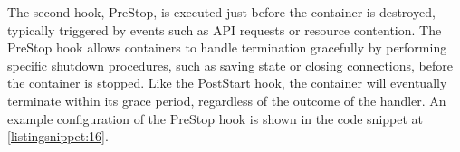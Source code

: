 
The second hook, PreStop, is executed just before the container is destroyed, typically triggered by events such as API requests or resource contention. The PreStop hook allows containers to handle termination gracefully by performing specific shutdown procedures, such as saving state or closing connections, before the container is stopped. Like the PostStart hook, the container will eventually terminate within its grace period, regardless of the outcome of the handler. An example configuration of the PreStop hook is shown in the code snippet at \autoref{listingsnippet:16}.





